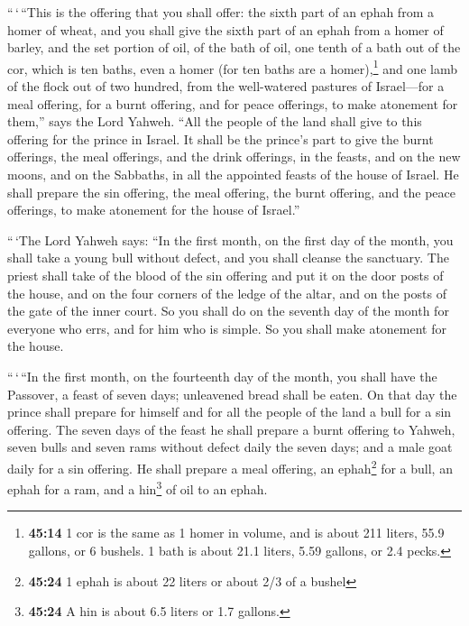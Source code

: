  ``\,`\,``This is the offering that you shall offer: the
sixth part of an ephah from a homer of wheat, and you shall give the
sixth part of an ephah from a homer of barley,  and the
set portion of oil, of the bath of oil, one tenth of a bath out of the
cor, which is ten baths, even a homer (for ten baths are a
homer),\footnote{\textbf{45:14} 1 cor is the same as 1 homer in volume,
  and is about 211 liters, 55.9 gallons, or 6 bushels. 1 bath is about
  21.1 liters, 5.59 gallons, or 2.4 pecks.}  and one lamb
of the flock out of two hundred, from the well-watered pastures of
Israel---for a meal offering, for a burnt offering, and for peace
offerings, to make atonement for them,'' says the Lord Yahweh.
 ``All the people of the land shall give to this offering
for the prince in Israel.  It shall be the prince's part
to give the burnt offerings, the meal offerings, and the drink
offerings, in the feasts, and on the new moons, and on the Sabbaths, in
all the appointed feasts of the house of Israel. He shall prepare the
sin offering, the meal offering, the burnt offering, and the peace
offerings, to make atonement for the house of Israel.''

 ``\,`The Lord Yahweh says: ``In the first month, on the
first day of the month, you shall take a young bull without defect, and
you shall cleanse the sanctuary.  The priest shall take
of the blood of the sin offering and put it on the door posts of the
house, and on the four corners of the ledge of the altar, and on the
posts of the gate of the inner court.  So you shall do on
the seventh day of the month for everyone who errs, and for him who is
simple. So you shall make atonement for the house.

 ``\,`\,``In the first month, on the fourteenth day of
the month, you shall have the Passover, a feast of seven days;
unleavened bread shall be eaten.  On that day the prince
shall prepare for himself and for all the people of the land a bull for
a sin offering.  The seven days of the feast he shall
prepare a burnt offering to Yahweh, seven bulls and seven rams without
defect daily the seven days; and a male goat daily for a sin offering.
 He shall prepare a meal offering, an ephah\footnote{\textbf{45:24}
  1 ephah is about 22 liters or about 2/3 of a bushel} for a bull, an
ephah for a ram, and a hin\footnote{\textbf{45:24} A hin is about 6.5
  liters or 1.7 gallons.} of oil to an ephah.

